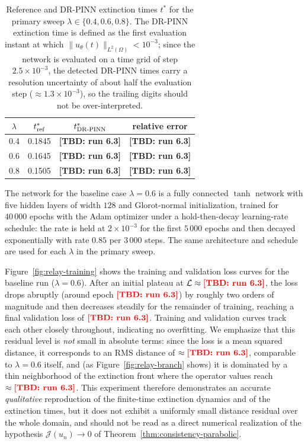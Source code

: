\documentclass[11pt]{elsarticle}
\newcommand{\TBD}[1]{{\color{red}\textbf{[TBD: #1]}}}
\providecommand{\RelayTRefA}{0.1845}
\providecommand{\RelayTRefB}{0.1645}
\providecommand{\RelayTRefC}{0.1505}
\providecommand{\RelayTNetA}{\TBD{run 6.3}}
\providecommand{\RelayTNetB}{\TBD{run 6.3}}
\providecommand{\RelayTNetC}{\TBD{run 6.3}}
\providecommand{\RelayRelErrA}{\TBD{run 6.3}}
\providecommand{\RelayRelErrB}{\TBD{run 6.3}}
\providecommand{\RelayRelErrC}{\TBD{run 6.3}}
\providecommand{\RelayValLoss}{\TBD{run 6.3}}
\providecommand{\RelayRMS}{\TBD{run 6.3}}
\providecommand{\RelayPlateauLevel}{\TBD{run 6.3}}
\providecommand{\RelayEscapeEpoch}{\TBD{run 6.3}}
\providecommand{\RelayZFrontMax}{\TBD{run 6.3}}
\theoremstyle{definition}
\theoremstyle{remark}
\numberwithin{equation}{section}
\begin{document}
\begin{table}[htbp]
  \centering
  \begin{tabular}{cccc}
    \toprule
    $\lambda$ & $t^*_{\rm ref}$ & $t^*_{\rm DR\text{-}PINN}$ & relative error \\
    \midrule
    0.4 & \RelayTRefA & \RelayTNetA & \RelayRelErrA \\
    0.6 & \RelayTRefB & \RelayTNetB & \RelayRelErrB \\
    0.8 & \RelayTRefC & \RelayTNetC & \RelayRelErrC \\
    \bottomrule
  \end{tabular}
  \caption{Reference and DR-PINN extinction times $t^*$ for the primary sweep
    $\lambda\in\{0.4,0.6,0.8\}$. The DR-PINN extinction time is defined as
    the first evaluation instant at which $\|u_\theta(t)\|_{L^2(\Omega)}<10^{-3}$;
    since the network is evaluated on a time grid of step
    $2.5\times10^{-3}$, the detected DR-PINN times carry a resolution
    uncertainty of about half the evaluation step
    ($\approx1.3\times10^{-3}$), so the trailing digits should not be
    over-interpreted.}
  \label{tab:relay-extinction}
\end{table}

The network for the baseline case $\lambda=0.6$ is a fully connected $\tanh$
network with five hidden layers of width $128$ and Glorot-normal initialization,
trained for $40\,000$ epochs with the Adam optimizer under a hold-then-decay
learning-rate schedule: the rate is held at $2\times10^{-3}$ for the first
$5\,000$ epochs and then decayed exponentially with rate $0.85$ per
$3\,000$ steps. The same architecture and schedule are used for each $\lambda$
in the primary sweep.

Figure~\ref{fig:relay-training} shows the training and validation loss curves
for the baseline run ($\lambda=0.6$). After an initial plateau at
$\mathcal{L}\approx \RelayPlateauLevel$, the loss drops abruptly (around
epoch $\RelayEscapeEpoch$) by roughly two orders of magnitude and then
decreases steadily for the remainder
of training, reaching a final validation loss of $\RelayValLoss$.
Training and validation curves track each other closely throughout,
indicating no overfitting. We emphasize that this residual level is
\emph{not} small in absolute terms: since the loss is a mean squared
distance, it corresponds to an RMS distance of
$\approx\RelayRMS$, comparable to $\lambda=0.6$ itself, and (as
Figure~\ref{fig:relay-branch} shows) it is dominated by a thin
neighborhood of the extinction front where the operator values reach
$\approx\RelayZFrontMax$. This experiment therefore demonstrates an accurate
\emph{qualitative} reproduction of the finite-time extinction dynamics
and of the extinction times, but it does not exhibit a uniformly small
distance residual over the whole domain, and should not be read as a
direct numerical realization of the hypothesis
$\mathcal{J}(u_n)\to0$ of Theorem~\ref{thm:consistency-parabolic}.
\end{document}
